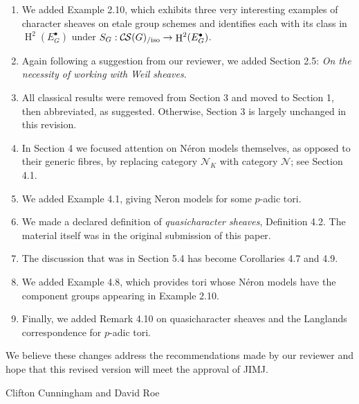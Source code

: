 \documentclass[a4, 10pt]{amsart}
\theoremstyle{definition}
\theoremstyle{remark}
\DeclareMathOperator{\Hh}{H}
\newcommand{\CS}{{\mathcal{C\hskip-0.8pt S}}}
\newcommand{\CSiso}[1]{\CS(#1)_{/\text{iso}}}
\begin{document}
\begin{enumerate}
\item 
We added Example 2.10, which exhibits three very interesting examples of character sheaves on etale group schemes and identifies each with its class in $\Hh^2(E_G^\bullet)$ under $S_G : \CSiso{G} \to \Hh^2(E^\bullet_G)$.
\item
Again following a suggestion from our reviewer, we added Section 2.5: {\it On the necessity of working with Weil sheaves}.
\item
All classical results were removed from Section 3 and moved to Section 1, then abbreviated, as suggested. Otherwise, Section 3 is largely unchanged in this revision.
\item
In Section 4 we focused attention on N\'eron models themselves, as opposed to their generic fibres, by replacing category $\mathcal{N}_K$ with category $\mathcal{N}$; see Section 4.1.
\item 
We added Example 4.1, giving Neron models for some $p$-adic tori.
\item
We made a declared definition of {\it quasicharacter sheaves}, Definition 4.2. The material itself was in the original submission of this paper.
\item
The discussion that was in Section 5.4 has become Corollaries 4.7 and 4.9.
\item
We added Example 4.8, which provides tori whose N\'eron models have the component groups appearing in Example 2.10.
\item
Finally, we added Remark 4.10 on quasicharacter sheaves and the Langlands correspondence for $p$-adic tori. 
\end{enumerate}

We believe these changes address the recommendations made by our reviewer and hope that this revised version will meet the approval of JIMJ.

\vskip0.3cm
\vskip0.4cm
\centerline{Clifton Cunningham and David Roe}
\end{document}
